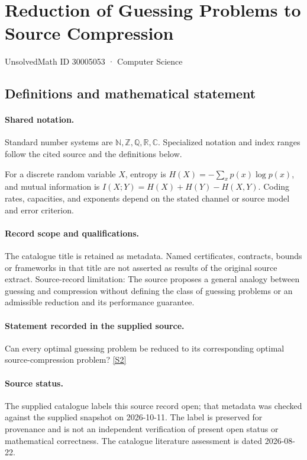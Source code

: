\documentclass[11pt]{article}
\newcommand{\sref}[2]{\hyperlink{source:#1:#2}{[S#2]}}
\begin{document}
\setcounter{section}{30005052}
\section{Reduction of Guessing Problems to Source Compression}\label{30005053}
{\small\sffamily UnsolvedMath ID 30005053 · Computer Science}
\subsection{Definitions and mathematical statement}

\paragraph{Shared notation.}Standard number systems are $\mathbb N,\mathbb Z,\mathbb Q,\mathbb R,\mathbb C$. Specialized notation and index ranges follow the cited source and the definitions below.


For a discrete random variable $X$, entropy is $H(X)=-\sum_xp(x)\log p(x)$, and mutual information is $I(X;Y)=H(X)+H(Y)-H(X,Y)$. Coding rates, capacities, and exponents depend on the stated channel or source model and error criterion.
\paragraph{Record scope and qualifications.}
The catalogue title is retained as metadata. Named certificates, contracts, bounds or frameworks in that title are not asserted as results of the original source extract.
Source-record limitation: The source proposes a general analogy between guessing and compression without defining the class of guessing problems or an admissible reduction and its performance guarantee.
\paragraph{Statement recorded in the supplied source.}
Can every optimal guessing problem be reduced to its corresponding optimal source-compression problem? \sref{30005053}{2}
\paragraph{Source status.}
The supplied catalogue labels this source record open; that metadata was checked against the supplied snapshot on 2026-10-11. The label is preserved for provenance and is not an independent verification of present open status or mathematical correctness. The catalogue literature assessment is dated 2026-08-22.
\end{document}
